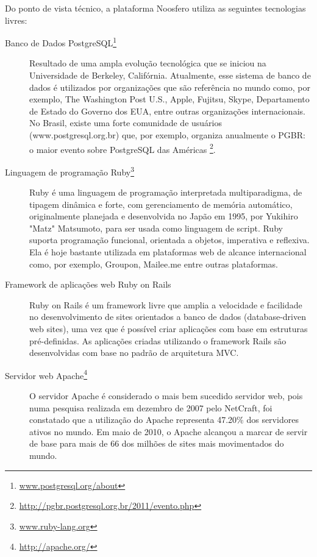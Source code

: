 \documentclass{article}
\begin{document}
Do ponto de vista técnico, a plataforma Noosfero utiliza as seguintes
tecnologias livres:

\begin{description}

  \item [Banco de Dados PostgreSQL\footnote{\url{www.postgresql.org/about}}]

  Resultado de uma ampla evolução tecnológica que se iniciou na Universidade de
  Berkeley, Califórnia. Atualmente, esse sistema de banco de dados é utilizados
  por organizações que são referência no mundo como, por exemplo, The
  Washington Post U.S., Apple, Fujitsu, Skype, Departamento de Estado do
  Governo dos EUA, entre outras organizações internacionais.  No Brasil, existe
  uma forte comunidade de usuários (www.postgresql.org.br) que, por exemplo,
  organiza anualmente o PGBR: o maior evento sobre PostgreSQL das Américas
  \footnote{\url{http://pgbr.postgresql.org.br/2011/evento.php}}.

  \item [Linguagem de programação Ruby\footnote{\url{www.ruby-lang.org}}]

  Ruby é uma linguagem de programação interpretada multiparadigma, de tipagem
  dinâmica e forte, com gerenciamento de memória automático, originalmente
  planejada e desenvolvida no Japão em 1995, por Yukihiro "Matz" Matsumoto,
  para ser usada como linguagem de script. Ruby suporta programação funcional,
  orientada a objetos, imperativa e reflexiva. Ela é hoje bastante utilizada em
  plataformas web de alcance internacional como, por exemplo, Groupon,
  Mailee.me entre outras plataformas.

  \item [Framework de aplicações web Ruby on Rails]
  
  Ruby on Rails é um framework livre que amplia a velocidade e facilidade no
  desenvolvimento de sites orientados a banco de dados (database-driven web
  sites), uma vez que é possível criar aplicações com base em estruturas
  pré-definidas. As aplicações criadas utilizando o framework Rails são
  desenvolvidas com base no padrão de arquitetura MVC.

  \item [Servidor web Apache\footnote{\url{http://apache.org/}}]

  O servidor Apache é considerado o mais bem sucedido servidor web, pois numa
  pesquisa realizada em dezembro de 2007 pelo NetCraft, foi constatado que a
  utilização do Apache representa 47.20\% dos servidores ativos no mundo. Em
  maio de 2010, o Apache alcançou a marcar de servir de base para mais de  66%
  dos milhões de sites mais movimentados do mundo.
 
\end{description}
\end{document}
